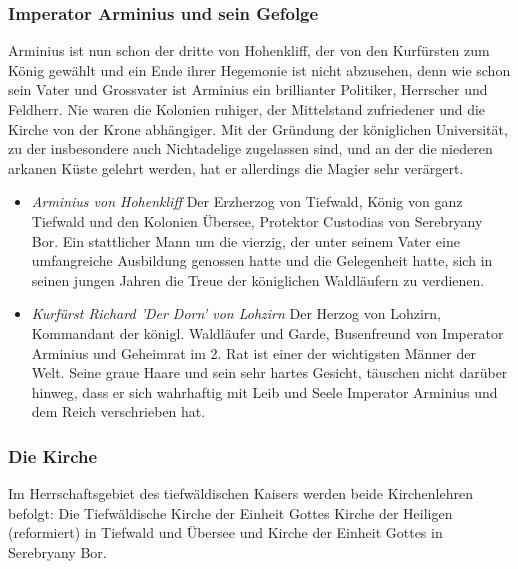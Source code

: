 \documentclass[12pt,twoside,twocolumn,openany]{book}
\begin{document}
\subsubsection{Imperator Arminius und sein Gefolge}
Arminius  ist nun schon der dritte von Hohenkliff, der von den Kurfürsten zum  König gewählt und ein Ende ihrer Hegemonie ist nicht abzusehen, denn wie schon sein Vater und Grossvater ist Arminius ein brillianter Politiker, Herrscher und Feldherr. Nie waren die Kolonien ruhiger, der Mittelstand zufriedener und die Kirche von der Krone abhängiger. Mit der Gründung der königlichen Universität, zu der insbesondere auch Nichtadelige zugelassen sind, und an der die niederen arkanen Küste gelehrt werden, hat er allerdings die Magier sehr verärgert.
\begin{itemize}
	\item\textit{Arminius von Hohenkliff} Der Erzherzog von Tiefwald, König von ganz Tiefwald und den Kolonien Übersee, Protektor Custodias von Serebryany Bor. Ein stattlicher Mann um die vierzig, der unter seinem Vater eine umfangreiche Ausbildung genossen hatte und die Gelegenheit hatte, sich in seinen jungen Jahren die Treue der königlichen Waldläufern zu verdienen.
	\item \textit{Kurfürst Richard 'Der Dorn' von Lohzirn} Der Herzog von Lohzirn, Kommandant der königl. Waldläufer und Garde, Busenfreund von Imperator Arminius und  Geheimrat im 2. Rat ist einer der wichtigsten Männer der Welt. Seine graue Haare und sein sehr hartes Gesicht, täuschen nicht darüber hinweg, dass er sich wahrhaftig mit Leib und Seele Imperator Arminius und dem Reich verschrieben hat.
\end{itemize}

\subsubsection{Die Kirche}

Im Herrschaftsgebiet des tiefwäldischen Kaisers werden beide Kirchenlehren befolgt: Die Tiefwäldische Kirche der Einheit Gottes Kirche der Heiligen (reformiert) in Tiefwald und Übersee und Kirche der Einheit Gottes in Serebryany Bor.
\end{document}
